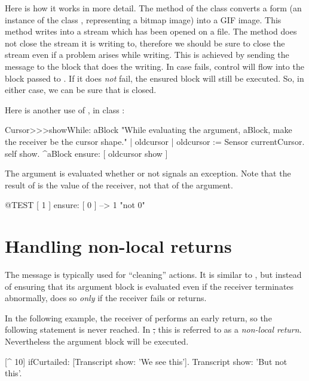 \documentclass[a4paper,10pt,twoside]{book}
\begin{document}
Here is how it works in more detail.
The  method of the class  converts a form (\ie an instance of the class , representing a bitmap image) into a GIF image. This method writes into a stream which has been opened on a file. The  method does not close the stream it is writing to, therefore we should be sure to close the stream even if a problem arises while writing. This is achieved by sending the message  to the block that does the writing. In case  fails, control will flow into the block passed to .  If it does \emph{not} fail, the ensured block will still be executed.  So, in either case, we can be sure that  is closed.

Here is another use of , in class :


\begin{code}{}
Cursor>>>showWhile: aBlock 
	"While evaluating the argument, aBlock,
	make the receiver be the cursor shape."
	| oldcursor |
	oldcursor := Sensor currentCursor.
	self show.
	^aBlock ensure: [ oldcursor show ]
\end{code}

The argument  is evaluated whether or not   signals an exception. Note that the result of  is the value of the receiver, not that of the argument.

\begin{code}{@TEST}
[ 1 ] ensure: [ 0 ] --> 1    "not 0"
\end{code}

\section{Handling non-local returns}

The message  is typically used for ``cleaning'' actions. It is similar to , but instead of ensuring that its argument block is evaluated even if the receiver terminates abnormally,  does so \emph{only} if the receiver fails or returns.

In the following example, the receiver of  performs an early return, so the following statement is never reached.
In \st, this is referred to as a \emph{non-local return}.
Nevertheless the argument block will be executed.
\begin{code}{}
[^ 10] ifCurtailed: [Transcript show: 'We see this'].
Transcript show: 'But not this'.
\end{code}
\end{document}
